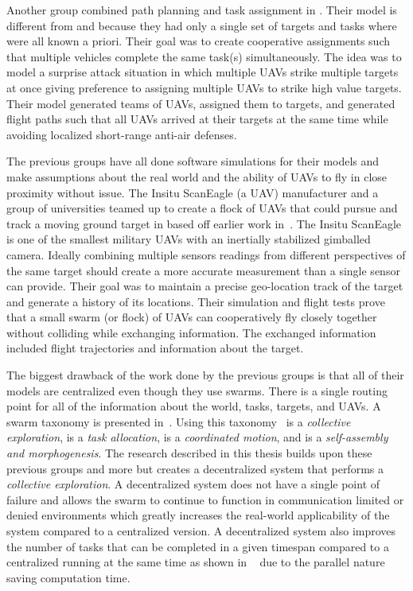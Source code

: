 Another group combined path planning and task assignment in \cite{beard}.  Their model is different from \cite{jin} and \cite{bellingham} because they had only a single set of targets and tasks where were all known a priori.  Their goal was to create cooperative assignments such that multiple vehicles complete the same task(s) simultaneously.  The idea was to model a surprise attack situation in which multiple UAVs strike multiple targets at once giving preference to assigning multiple UAVs to strike high value targets.  Their model generated teams of UAVs, assigned them to targets, and generated flight paths such that all UAVs arrived at their targets at the same time while avoiding localized short-range anti-air defenses.

The previous groups have all done software simulations for their models and make assumptions about the real world and the ability of UAVs to fly in close proximity without issue.  The Insitu ScanEagle (a UAV) manufacturer and a group of universities teamed up to create a flock of UAVs that could pursue and track a moving ground target in \cite{wheeler} based off earlier work in~\cite{wise_rolf}.  The Insitu ScanEagle is one of the smallest military UAVs with an inertially stabilized gimballed camera.  Ideally combining multiple sensors readings from different perspectives of the same target should create a more accurate measurement than a single sensor can provide.  Their goal was to maintain a precise geo-location track of the target and generate a history of its locations.  Their simulation and flight tests prove that a small swarm (or flock) of UAVs can cooperatively fly closely together without colliding while exchanging information.  The exchanged information included flight trajectories and information about the target. 

The biggest drawback of the work done by the previous groups is that all of their models are centralized even though they use swarms.  There is a single routing point for all of the information about the world, tasks, targets, and UAVs.  A swarm taxonomy is presented in~\cite{iridia}.  Using this taxonomy~\cite{jin} is a \textit{collective exploration}, \cite{bellingham} is a \textit{task allocation}, \cite{beard} is a \textit{coordinated motion}, and \cite{wheeler} is a \textit{self-assembly and morphogenesis}.  The research described in this thesis  builds upon these previous groups and more but creates a decentralized system that performs a \textit{collective exploration}.  A decentralized system does not have a single point of failure and allows the swarm to continue to function in communication limited or denied environments which greatly increases the real-world applicability of the system compared to a centralized version.  A decentralized system also improves the number of tasks that can be completed in a given timespan compared to a centralized running at the same time as shown in ~\cite{chien} due to the parallel nature saving computation time.
